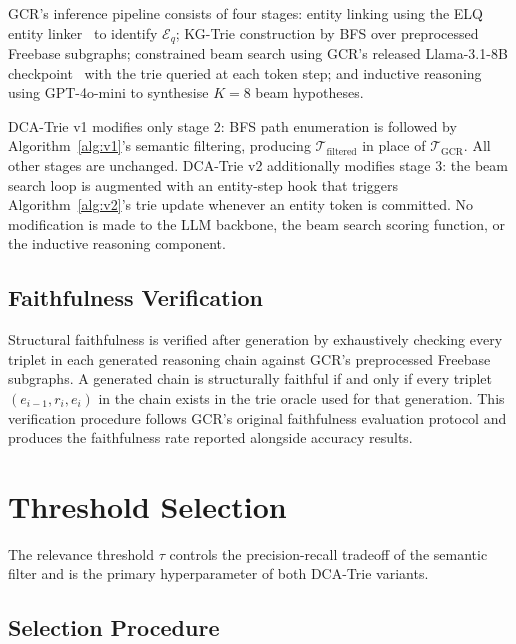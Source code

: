 GCR's inference pipeline consists of four stages: entity linking using the ELQ entity linker~\citep{decao2021autoregressive} to identify $\mathcal{E}_q$; KG-Trie construction by BFS over preprocessed Freebase subgraphs; constrained beam search using GCR's released Llama-3.1-8B checkpoint~\citep{dubey2024llama3} with the trie queried at each token step; and inductive reasoning using GPT-4o-mini to synthesise $K=8$ beam hypotheses.

DCA-Trie v1 modifies only stage 2: BFS path enumeration is followed by Algorithm~\ref{alg:v1}'s semantic filtering, producing $\mathcal{T}_{\text{filtered}}$ in place of $\mathcal{T}_{\text{GCR}}$. All other stages are unchanged. DCA-Trie v2 additionally modifies stage 3: the beam search loop is augmented with an entity-step hook that triggers Algorithm~\ref{alg:v2}'s trie update whenever an entity token is committed. No modification is made to the LLM backbone, the beam search scoring function, or the inductive reasoning component.

\subsection{Faithfulness Verification}

Structural faithfulness is verified after generation by exhaustively checking every triplet in each generated reasoning chain against GCR's preprocessed Freebase subgraphs. A generated chain is structurally faithful if and only if every triplet $(e_{i-1}, r_i, e_i)$ in the chain exists in the trie oracle used for that generation. This verification procedure follows GCR's original faithfulness evaluation protocol and produces the faithfulness rate reported alongside accuracy results.

\section{Threshold Selection}
\label{sec:threshold}

The relevance threshold $\tau$ controls the precision-recall tradeoff of the semantic filter and is the primary hyperparameter of both DCA-Trie variants.

\subsection{Selection Procedure}

